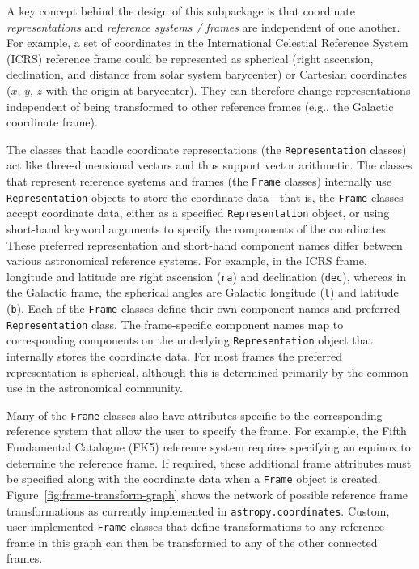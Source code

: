 \documentclass[modern]{aastex61}
\renewcommand{\figurename}{Figure\xspace}
\begin{document}
A key concept behind the design of this subpackage is that coordinate
\textit{representations} and \textit{reference systems / frames} are independent
of one another.
For example, a set of coordinates in the International Celestial Reference
System (ICRS) reference frame could be represented as spherical (right
ascension, declination, and distance from solar system barycenter) or Cartesian
coordinates ($x$, $y$, $z$ with the origin at barycenter).
They can therefore change representations independent of being transformed to
other reference frames (e.g., the Galactic coordinate frame).

The classes that handle coordinate representations (the \texttt{Representation}
classes) act like three-dimensional vectors and thus support vector arithmetic.
The classes that represent reference systems and frames (the \texttt{Frame}
classes) internally use \texttt{Representation} objects to store the coordinate
data---that is, the \texttt{Frame} classes accept coordinate data, either as a
specified \texttt{Representation} object, or using short-hand keyword arguments
to specify the components of the coordinates.
These preferred representation and short-hand component names differ between
various astronomical reference systems.
For example, in the ICRS frame, longitude and latitude are right ascension
(\texttt{ra}) and declination (\texttt{dec}), whereas in the Galactic frame, the
spherical angles are Galactic longitude (\texttt{l}) and latitude (\texttt{b}).
Each of the \texttt{Frame} classes define their own component names and
preferred \texttt{Representation} class.
The frame-specific component names map to corresponding components on the
underlying \texttt{Representation} object that internally stores the coordinate
data.
For most frames the preferred representation is spherical, although this is
determined primarily by the common use in the astronomical community.

Many of the \texttt{Frame} classes also have attributes specific to the
corresponding reference system that allow the user to specify the frame.
For example, the Fifth Fundamental Catalogue (FK5) reference system requires
specifying an equinox to determine the reference frame.
If required, these additional frame attributes must be specified along with the
coordinate data when a \texttt{Frame} object is created.
\figurename~\ref{fig:frame-transform-graph} shows the network of possible
reference frame transformations as currently implemented in
\texttt{astropy.coordinates}.
Custom, user-implemented \texttt{Frame} classes that define transformations to
any reference frame in this graph can then be transformed to any of the other
connected frames.
\end{document}
